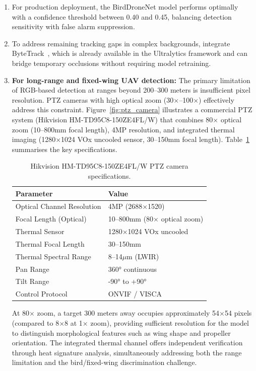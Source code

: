 \documentclass[12pt,a4paper]{report}
\begin{document}
\begin{enumerate}
  \item For production deployment, the BirdDroneNet model performs optimally with a confidence threshold between 0.40 and 0.45, balancing detection sensitivity with false alarm suppression.
  
  \item To address remaining tracking gaps in complex backgrounds, integrate ByteTrack~\cite{zhang2022bytetrack}, which is already available in the Ultralytics framework and can bridge temporary occlusions without requiring model retraining.
  
  \item \textbf{For long-range and fixed-wing UAV detection:} The primary limitation of RGB-based detection at ranges beyond 200--300 meters is insufficient pixel resolution. PTZ cameras with high optical zoom (30$\times$--100$\times$) effectively address this constraint. Figure~\ref{fig:ptz_camera} illustrates a commercial PTZ system (Hikvision HM-TD95C8-150ZE4FL/W) that combines 80$\times$ optical zoom (10--800mm focal length), 4MP resolution, and integrated thermal imaging (1280$\times$1024 VOx uncooled sensor, 30--150mm focal length). Table~\ref{tab:ptz_specs} summarises the key specifications.

\begin{table}[H]
\centering
\caption[PTZ camera specifications]{Hikvision HM-TD95C8-150ZE4FL/W PTZ camera specifications.}
\label{tab:ptz_specs}
\begin{tabular}{|l|l|}
\hline
\textbf{Parameter} & \textbf{Value} \\
\hline
Optical Channel Resolution & 4MP (2688$\times$1520) \\
\hline
Focal Length (Optical) & 10--800mm (80$\times$ optical zoom) \\
\hline
Thermal Sensor & 1280$\times$1024 VOx uncooled \\
\hline
Thermal Focal Length & 30--150mm \\
\hline
Thermal Spectral Range & 8--14$\mu$m (LWIR) \\
\hline
Pan Range & 360° continuous \\
\hline
Tilt Range & -90° to +90° \\
\hline
Control Protocol & ONVIF / VISCA \\
\hline
\end{tabular}
\end{table}

        At 80$\times$ zoom, a target 300 meters away occupies approximately 54$\times$54 pixels (compared to 8$\times$8 at 1$\times$ zoom), providing sufficient resolution for the model to distinguish morphological features such as wing shape and propeller orientation. The integrated thermal channel offers independent verification through heat signature analysis, simultaneously addressing both the range limitation and the bird/fixed-wing discrimination challenge.
  

\end{enumerate}
\end{document}

